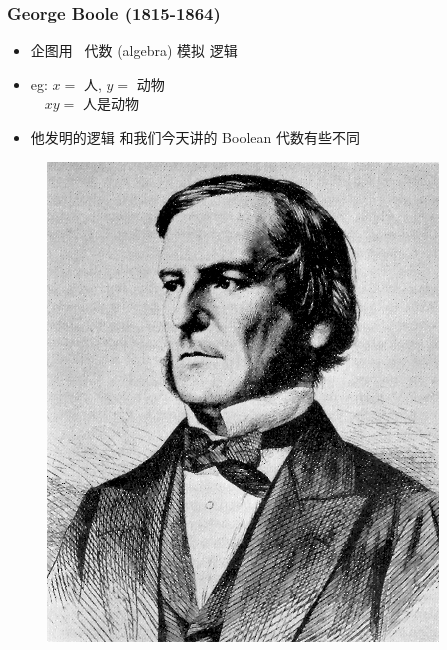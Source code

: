 \documentclass[15pt]{beamer}
\begin{document}
\begin{frame}
\frametitle{George Boole (1815-1864)}
\begin{minipage}[t]{0.6\linewidth}
	\begin{itemize}
		\item 企图用 {\color{red} \ 代数} (algebra) 模拟 逻辑
		\item eg: $x =$ 人, $y =$ 动物 \\
		$\quad xy =$ 人是动物
		\item 他发明的逻辑 和我们今天讲的 Boolean 代数有些不同
	\end{itemize}
\end{minipage}
\hfill
\begin{minipage}[t]{0.35\linewidth}
	\begin{figure}[H]
		\includegraphics[scale=1.0]{Boole.jpg}
	\end{figure}
\end{minipage}
\end{frame}
\end{document}
